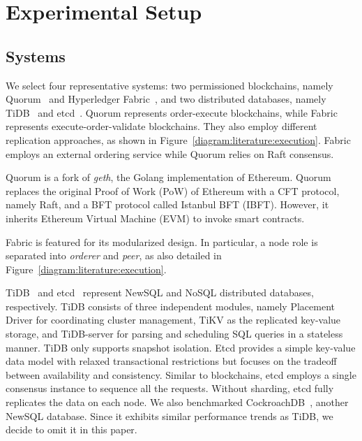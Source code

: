\section{Experimental Setup}
\label{sec:twin:setup}
\subsection{Systems}

We select four representative systems: two permissioned blockchains, namely Quorum~\cite{web:quorum} and Hyperledger Fabric~\cite{web:fabric}, and two distributed databases, namely TiDB~\cite{web:tidb} and etcd~\cite{web:etcd}.
Quorum represents order-execute blockchains, while Fabric represents execute-order-validate blockchains. 
They also employ different replication approaches, as shown in Figure~\ref{diagram:literature:execution}.
Fabric employs an external ordering service while Quorum relies on Raft consensus.

Quorum is a fork of \textit{geth}, the Golang implementation of Ethereum. 
Quorum replaces the original Proof of Work (PoW) of Ethereum with a CFT protocol, namely Raft, and a BFT protocol called
Istanbul BFT (IBFT). However, it inherits Ethereum Virtual Machine (EVM) to invoke smart contracts.

Fabric is featured for its modularized design. 
In particular, a node role is separated into \textit{orderer} and \textit{peer}, as also detailed in Figure~\ref{diagram:literature:execution}.

TiDB~\cite{web:tidb} and etcd~\cite{web:etcd} represent NewSQL and NoSQL
distributed databases, respectively.
TiDB consists of three independent modules, namely Placement Driver for
coordinating cluster management, TiKV as the replicated key-value storage, and
TiDB-server for parsing and scheduling SQL queries in a stateless manner. TiDB
only supports snapshot isolation.
Etcd provides a simple key-value data model with relaxed transactional
restrictions but focuses on the tradeoff between availability and consistency.
Similar to blockchains, etcd employs a single consensus instance to sequence all
the requests.
Without sharding, etcd fully replicates the data on each node.
We also benchmarked CockroachDB~\cite{web:cockroach}, another NewSQL database. Since it exhibits similar performance trends as TiDB, we decide to omit it in this paper. 

